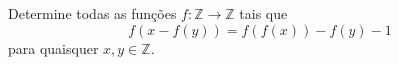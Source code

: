 Determine todas as funções $f:\mathbb{Z}\rightarrow\mathbb{Z}$ tais que
\[f(x-f(y))=f(f(x))-f(y)-1\]
para quaisquer $x,y\in\mathbb{Z}$.
